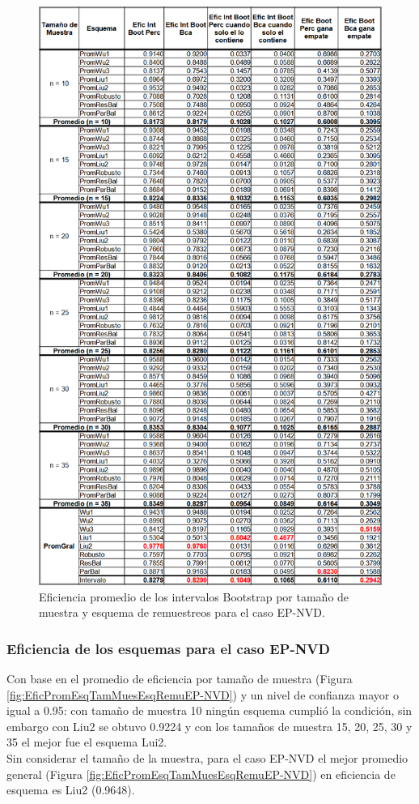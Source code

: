 \begin{figure}[ht] 
	\centering 
	\includegraphics[width=0.55\linewidth]{img/EP_NVD_Efic_Boots.png} 
	\caption{Eficiencia promedio de los intervalos Bootstrap por tamaño de muestra y esquema de remuestreos para el caso EP-NVD.} 
	\label{fig:EficPromIntBootsTamMuestEsqRemuEP-NVD}
\end{figure}
\FloatBarrier

\subsubsection{Eficiencia de los esquemas para el caso EP-NVD}
Con base en el promedio de eficiencia por tamaño de muestra (Figura \ref{fig:EficPromEsqTamMuesEsqRemuEP-NVD}) y un nivel de confianza mayor o igual a 0.95: con tamaño de muestra 10 ningún esquema cumplió la condición, sin embargo con Liu2 se obtuvo 0.9224 y con los tamaños de muestra 15, 20, 25, 30 y 35 el mejor fue el esquema Lui2.\\

Sin considerar el tamaño de la muestra, para el caso EP-NVD el mejor promedio general (Figura \ref{fig:EficPromEsqTamMuesEsqRemuEP-NVD}) en eficiencia de esquema es Liu2 (0.9648).


